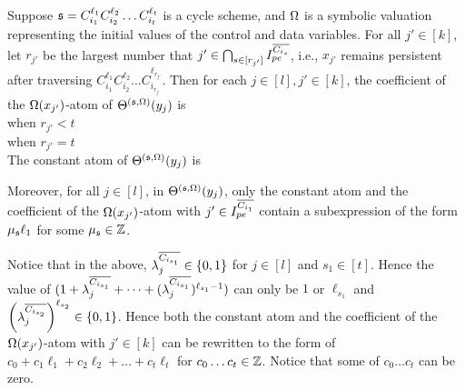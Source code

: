 \begin{lemma}\label{prop-cycle-schm}
Suppose ${\mathfrak{s} }=C_{i_1}^{\ell_1} C_{i_2}^{\ell_2} \dots C_{i_t}^{\ell_t}$ is a cycle scheme, and $\Omega$ is a symbolic valuation representing the initial values of the control and data variables. 
For all $j'\in[k]$, let $r_{j'}$ be the largest number that $j'\in\bigcap_{s\in[r_{j'}]} I^{\overline{C_{i_{s}}}}_{pe}$, i.e., $x_{j'}$ remains persistent after traversing $C_{i_1}^{\ell_1} C_{i_2}^{\ell_2} \dots C_{i_{r_j}}^{\ell_{r_{j'}}}$.
Then for each $j\in [l], j' \in[k]$, the coefficient of the $\Omega(x_{j'})$-atom of $\Theta^{({\mathfrak{s} },\Omega)}(y_j)$ is\smallskip\\
 when $r_{j'}<t$\smallskip\\
	 \hspace{2.55cm} when $r_{j'}=t$\smallskip\\
The constant atom of $\Theta^{({\mathfrak{s} },\Omega)}(y_j)$ is 
\begin{center}
\end{center}
Moreover, for all $j \in [l]$, in $\Theta^{({\mathfrak{s} },\Omega)}(y_j)$, only the constant atom and the coefficient of the $\Omega(x_{j'})$-atom with $j' \in  I^{\overline{C_{i_{1}}}}_{pe}$ contain a subexpression of the form $ \mu_{\mathfrak{s} } \ell_1$ for some $\mu_{\mathfrak{s} }\in {\mathbb{Z} }$.
\end{lemma}
Notice that in the above, $\lambda^{\overline{C_{i_{s_1}}}}_j\in\{0,1\}$ for $j\in[l]$ and $s_1\in [t]$. Hence the value of $(1+\lambda^{\overline{C_{i_{s_1}}}}_{j} + \dots + (\lambda^{\overline{C_{i_{s_1}}}}_{j})^{\ell_{s_1}-1} )$ can only be $1$ or $\ell_{s_1}$ and $\left(\lambda^{\overline{C_{i_{s_2}}}}_{j}\right)^{\ell_{s_2}}\in\{0,1\}$.
Hence both the constant atom and the coefficient of the $\Omega(x_{j'})$-atom with $j'\in [k]$ can be rewritten to the form of $c_0+c_1\ell_1+c_2\ell_2+\dots+c_t\ell_t$ for $c_0\ldots c_t\in {\mathbb{Z} }$. Notice that some of $c_0\ldots c_t$ can be zero.




